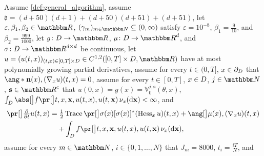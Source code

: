\begin{algo}
	\label{frame:adam}
	Assume 
		\cref{def:general_algorithm}, 
	assume
		$\mathfrak{d}=(d+50)(d+1)+ (d+50)(d+51)+(d+51)$,
	let
		$\varepsilon,\beta_1,\beta_2\in\R$,
		$(\gamma_m)_{m\in\N}\subseteq (0,\infty)$
	satisfy
		$\varepsilon=10^{-8}$,
		$\beta_1 = \tfrac{9}{10}$,
		and $\beta_2 = \tfrac{999}{1000}$,
	let
		$g\colon D \to \R$,
		$\mu\colon D\to\R^d$, and
		$\sigma\colon D\to\R^{d\times d}$
		be continuous,
	let %
		$u=(u(t,x))_{(t,x) \in [0,T]\times \D} \in C^{1,2}([0,T]\times \D,\R)$
		have at most polynomially growing partial derivatives, 
		assume 
			for every
				$t\in (0,T]$,
				$x\in \partial_D$
			that
				$ \ang*{\mathbf{n}(x) ,(\nabla_x u)(t,x)} = 0$,
	assume 
		for every
			$t\in [0,T]$,
			$x\in D$,
			$j \in \N$,
			$\mathbf{s} \in \R^\varsigma$
		that
			$u(0,x)=g(x) = \mathbb V^{ j, \mathbf{s} }_0( \theta, x )$,
			$\int_\D \babs{f\bpr{t,x,\mathbf{x}, u(t,x),u(t,\mathbf{x})
			} } \, \nu_x(\diff \mathbf{x}) < \infty$, and
		\begin{equation}
		\begin{split}
		\label{eq:PDE-Examples}
			\bpr{\tfrac{\partial}{\partial t}u}(t,x)
			&=
			\tfrac{ 1 }{ 2 } \Trace\bpr{\sigma(x) [ \sigma(x) ]^*( \Hess_x u)( t,x )}
			+ \bang{ \mu(x), ( \nabla_x u )( t,x ) }
			\\& \quad 
			+ \int_{\D} f\bpr{t,x,\mathbf{x}, u(t,x),u(t,\mathbf{x})
			} \, \nu_x(\diff\mathbf{x}) 
			,
		\end{split}
		\end{equation}
	assume 
		for every
			$m\in\N$,
			$i\in\{0,1,\ldots,N\} $ 
		that
			$ J_m = 8000$,
			$ t_i = \tfrac{iT}{N} $, and

\end{algo}
